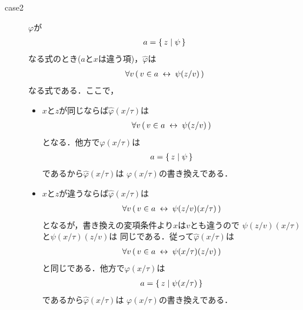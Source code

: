 \begin{metaprf}
\begin{description}
\begin{description}
					\item[case2] $\varphi$が
						\begin{align}
							a = \{\, z \mid \psi\, \}
						\end{align}
						なる式のとき($a$と$x$は違う項)，$\widehat{\varphi}$は
						\begin{align}
							\forall v\, (\, v \in a \hspace{0.25em}\leftrightarrow\hspace{0.25em} \psi(z/v)\, )
						\end{align}
						なる式である．ここで，
						\begin{itemize}
							\item $x$と$z$が同じならば$\widehat{\varphi}(x/\tau)$は
								\begin{align}
									\forall v\, (\, v \in a \hspace{0.25em}\leftrightarrow\hspace{0.25em} \psi(z/v)\, )
								\end{align}
								となる．他方で$\varphi(x/\tau)$は
								\begin{align}
									a = \{\, z \mid \psi\, \}
								\end{align}
								であるから$\widehat{\varphi}(x/\tau)$は
								$\varphi(x/\tau)$の書き換えである．
								
							\item $x$と$z$が違うならば$\widehat{\varphi}(x/\tau)$は
								\begin{align}
									\forall v\, (\, v \in a \hspace{0.25em}\leftrightarrow\hspace{0.25em} \psi(z/v)(x/\tau)\, )
								\end{align}
								となるが，書き換えの変項条件より$x$は$v$とも違うので
								$\psi(z/v)(x/\tau)$と$\psi(x/\tau)(z/v)$は
								同じである．従って$\widehat{\varphi}(x/\tau)$は
								\begin{align}
									\forall v\, (\, v \in a \hspace{0.25em}\leftrightarrow\hspace{0.25em} \psi(x/\tau)(z/v)\, )
								\end{align}
								と同じである．他方で$\varphi(x/\tau)$は
								\begin{align}
									a = \{\, z \mid \psi(x/\tau)\, \}
								\end{align}
								であるから$\widehat{\varphi}(x/\tau)$は
								$\varphi(x/\tau)$の書き換えである．
						\end{itemize}
					

\end{description}
\end{description}
\end{metaprf}
